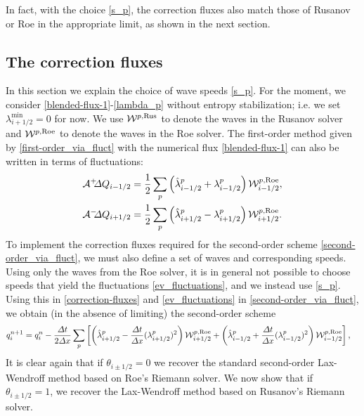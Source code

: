 \documentclass[preprint, 11pt]{article}
\newcommand{\W}{{\mathcal W}}
\newcommand{\A}{{\mathcal A}}
\newcommand{\apdq}{\A^+ \!\!{\Delta} Q}
\newcommand{\amdq}{\A^- \!\!{\Delta} Q}
\newcommand{\imh}{{i-1/2}}
\newcommand{\iph}{{i+1/2}}
\newcommand{\Rus}{{\rm Rus}}
\newcommand{\Roe}{{\rm Roe}}
\begin{document}
In fact, with the choice \eqref{s_p}, the correction fluxes also match
those of Rusanov or Roe in the appropriate limit, as shown in the next section.

\subsection{The correction fluxes}\label{sec:blended_rs}
In this section we explain the choice of wave speeds \eqref{s_p}.
For the moment, we consider \eqref{blended-flux-1}-\eqref{lambda_p} without
entropy stabilization; i.e. we set $\lambda^{\min}_\iph=0$
for now.
We use $\W^{p,\Rus}$ to denote the waves in the Rusanov
solver and $\W^{p,\Roe}$ to denote the waves in the Roe solver.
The first-order method given by \eqref{first-order_via_fluct} with the numerical
flux \eqref{blended-flux-1} can also be written in
terms of fluctuations:
\begin{subequations}\label{ev_fluctuations}
\begin{align}
  \apdq_\imh & = \frac{1}{2}\sum_p \left(\hat\lambda_{i-1/2}^p + \lambda_{i-1/2}^p\right)\W_{i-1/2}^{p,\Roe}, \\
  \amdq_\iph & = \frac{1}{2}\sum_p \left(\hat\lambda_{i+1/2}^p - \lambda_{i+1/2}^p\right)\W_{i+1/2}^{p,\Roe}.
\end{align}
\end{subequations}
To implement the correction fluxes required for the second-order scheme \eqref{second-order_via_fluct},
we must also define a set of waves and corresponding speeds.
Using only the waves from the Roe solver, it is in general not possible
to choose speeds that yield the fluctuations \eqref{ev_fluctuations},
and we instead use \eqref{s_p}.
Using this in \eqref{correction-fluxes} and \eqref{ev_fluctuations} in 
\eqref{second-order_via_fluct}, we obtain (in the absence of limiting)
the second-order scheme
\begin{align*}
  q_i^{n+1}=q_i^n
  &-\frac{\Delta t}{2 \Delta x}
  \sum_p
  \left[\left(\hat\lambda_{i+1/2}^p -\frac{\Delta t}{\Delta x}(\lambda_{i+1/2}^p)^2 \right)\W_{i+1/2}^{p,\Roe}
  +
  \left(\hat\lambda_{i-1/2}^p +\frac{\Delta t}{\Delta x}(\lambda_{i-1/2}^p)^2 \right)\W_{i-1/2}^{p,\Roe}\right],
\end{align*}
It is clear again that if $\theta_{i\pm 1/2}=0$ we recover the standard
second-order Lax-Wendroff method based on Roe's Riemann solver.
We now show that if $\theta_{i\pm 1/2}=1$, we recover the Lax-Wendroff method
based on Rusanov's Riemann solver.
\end{document}
